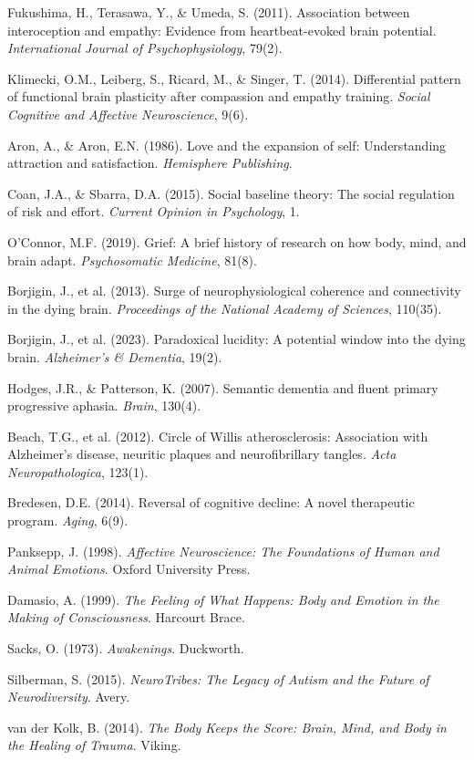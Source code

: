  Fukushima, H., Terasawa, Y., \& Umeda, S. (2011). Association between interoception and empathy: Evidence from heartbeat-evoked brain potential. \emph{International Journal of Psychophysiology}, 79(2).

 Klimecki, O.M., Leiberg, S., Ricard, M., \& Singer, T. (2014). Differential pattern of functional brain plasticity after compassion and empathy training. \emph{Social Cognitive and Affective Neuroscience}, 9(6).

 Aron, A., \& Aron, E.N. (1986). Love and the expansion of self: Understanding attraction and satisfaction. \emph{Hemisphere Publishing}.

 Coan, J.A., \& Sbarra, D.A. (2015). Social baseline theory: The social regulation of risk and effort. \emph{Current Opinion in Psychology}, 1.

 O’Connor, M.F. (2019). Grief: A brief history of research on how body, mind, and brain adapt. \emph{Psychosomatic Medicine}, 81(8).

 Borjigin, J., et al. (2013). Surge of neurophysiological coherence and connectivity in the dying brain. \emph{Proceedings of the National Academy of Sciences}, 110(35).

 Borjigin, J., et al. (2023). Paradoxical lucidity: A potential window into the dying brain. \emph{Alzheimer’s \& Dementia}, 19(2).

 Hodges, J.R., \& Patterson, K. (2007). Semantic dementia and fluent primary progressive aphasia. \emph{Brain}, 130(4).

 Beach, T.G., et al. (2012). Circle of Willis atherosclerosis: Association with Alzheimer’s disease, neuritic plaques and neurofibrillary tangles. \emph{Acta Neuropathologica}, 123(1).

 Bredesen, D.E. (2014). Reversal of cognitive decline: A novel therapeutic program. \emph{Aging}, 6(9).

 Panksepp, J. (1998). \emph{Affective Neuroscience: The Foundations of Human and Animal Emotions}. Oxford University Press.

 Damasio, A. (1999). \emph{The Feeling of What Happens: Body and Emotion in the Making of Consciousness}. Harcourt Brace.

 Sacks, O. (1973). \emph{Awakenings}. Duckworth.

 Silberman, S. (2015). \emph{NeuroTribes: The Legacy of Autism and the Future of Neurodiversity}. Avery.

 van der Kolk, B. (2014). \emph{The Body Keeps the Score: Brain, Mind, and Body in the Healing of Trauma}. Viking.

